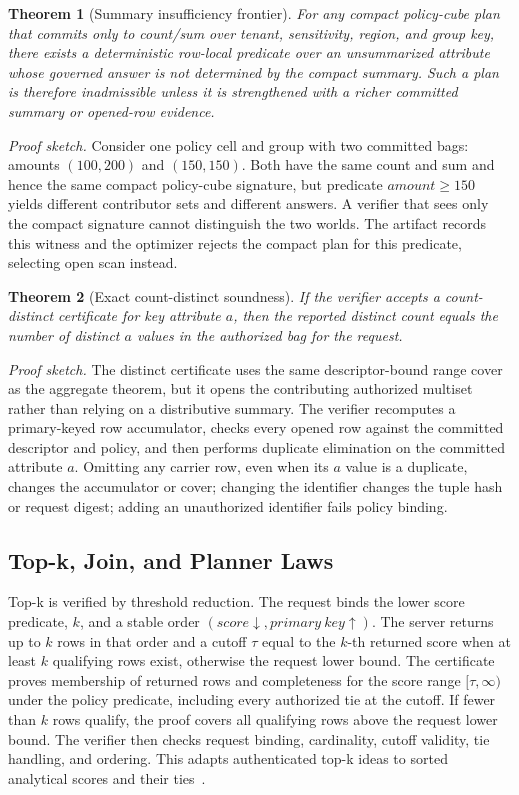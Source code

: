 \documentclass[conference]{IEEEtran}
\newtheorem{theorem}{Theorem}
\begin{document}
\begin{theorem}[Summary insufficiency frontier]
For any compact policy-cube plan that commits only to count/sum over tenant, sensitivity, region, and group key, there exists a deterministic row-local predicate over an unsummarized attribute whose governed answer is not determined by the compact summary. Such a plan is therefore inadmissible unless it is strengthened with a richer committed summary or opened-row evidence.
\end{theorem}

\noindent\emph{Proof sketch.} Consider one policy cell and group with two committed bags: amounts $(100,200)$ and $(150,150)$. Both have the same count and sum and hence the same compact policy-cube signature, but predicate $amount\ge150$ yields different contributor sets and different answers. A verifier that sees only the compact signature cannot distinguish the two worlds. The artifact records this witness and the optimizer rejects the compact plan for this predicate, selecting open scan instead.

\begin{theorem}[Exact count-distinct soundness]
If the verifier accepts a count-distinct certificate for key attribute $a$, then the reported distinct count equals the number of distinct $a$ values in the authorized bag for the request.
\end{theorem}

\noindent\emph{Proof sketch.} The distinct certificate uses the same descriptor-bound range cover as the aggregate theorem, but it opens the contributing authorized multiset rather than relying on a distributive summary. The verifier recomputes a primary-keyed row accumulator, checks every opened row against the committed descriptor and policy, and then performs duplicate elimination on the committed attribute $a$. Omitting any carrier row, even when its $a$ value is a duplicate, changes the accumulator or cover; changing the identifier changes the tuple hash or request digest; adding an unauthorized identifier fails policy binding.


\subsection{Top-k, Join, and Planner Laws}
Top-k is verified by threshold reduction. The request binds the lower score predicate, $k$, and a stable order $(score\downarrow, primary\ key\uparrow)$. The server returns up to $k$ rows in that order and a cutoff $\tau$ equal to the $k$-th returned score when at least $k$ qualifying rows exist, otherwise the request lower bound. The certificate proves membership of returned rows and completeness for the score range $[\tau,\infty)$ under the policy predicate, including every authorized tie at the cutoff. If fewer than $k$ rows qualify, the proof covers all qualifying rows above the request lower bound. The verifier then checks request binding, cardinality, cutoff validity, tie handling, and ordering. This adapts authenticated top-k ideas to sorted analytical scores and their ties~\cite{chen2013topk}.
\end{document}
